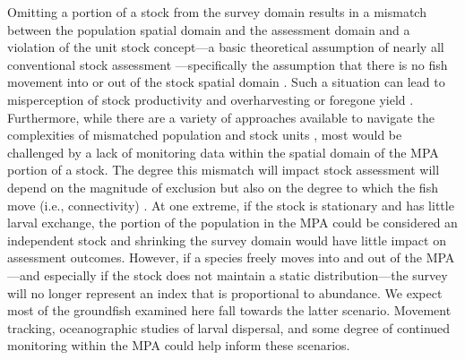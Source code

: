 \documentclass[12pt]{article}
\newcommand{\R}[1]{\label{#1}\linelabel{#1}}
\begin{document}
\begin{spacing}{1.4}

\R{B3}Omitting a portion of a stock from the survey domain results in a mismatch between the population spatial domain and the assessment domain \citep{field2006} and a violation of the unit stock concept---a basic theoretical assumption of nearly all conventional stock assessment \citep{russell1931, cushing1968}---specifically the assumption that there is no fish movement into or out of the stock spatial domain \citep[e.g.,][]{cadrin2020}.
Such a situation can lead to misperception of stock productivity and overharvesting or foregone yield \citep[e.g.,][]{goethel2011, mcgilliard2015, kerr2017}.
Furthermore, while there are a variety of approaches available to navigate the complexities of mismatched population and stock units \citep{kerr2017}, most would be challenged by a lack of monitoring data within the spatial domain of the MPA portion of a stock.
The degree this mismatch will impact stock assessment will depend on the magnitude of exclusion but also on the degree to which the fish move (i.e., connectivity) \citep{field2006}.
At one extreme, if the stock is stationary and has little larval exchange, the portion of the population in the MPA could be considered an independent stock and shrinking the survey domain would have little impact on assessment outcomes.
However, if a species freely moves into and out of the MPA---and especially if the stock does not maintain a static distribution---the survey will no longer represent an index that is proportional to abundance.
We expect most of the groundfish examined here fall towards the latter scenario.
Movement tracking, oceanographic studies of larval dispersal, and some degree of continued monitoring within the MPA could help inform these scenarios.






\end{spacing}
\end{document}
